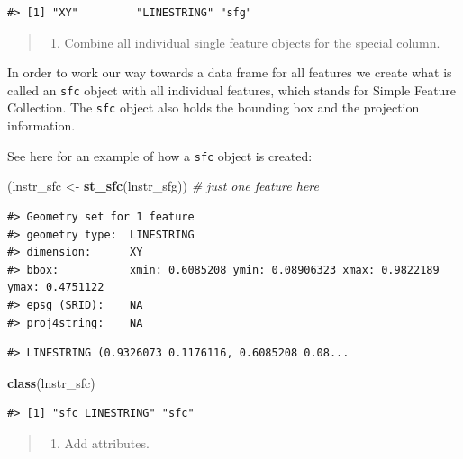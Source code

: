 \documentclass[]{book}
\newenvironment{Shaded}{\begin{snugshade}}{\end{snugshade}}
\newcommand{\KeywordTok}[1]{\textcolor[rgb]{0.13,0.29,0.53}{\textbf{#1}}}
\newcommand{\StringTok}[1]{\textcolor[rgb]{0.31,0.60,0.02}{#1}}
\newcommand{\CommentTok}[1]{\textcolor[rgb]{0.56,0.35,0.01}{\textit{#1}}}
\newcommand{\NormalTok}[1]{#1}
\providecommand{\tightlist}{%
  \setlength{\itemsep}{0pt}\setlength{\parskip}{0pt}}
\theoremstyle{definition}
\theoremstyle{definition}
\theoremstyle{definition}
\theoremstyle{remark}
\begin{document}
\begin{verbatim}
#> [1] "XY"         "LINESTRING" "sfg"
\end{verbatim}

\begin{quote}
\begin{enumerate}
\def\labelenumi{\Roman{enumi}.}
\setcounter{enumi}{1}
\tightlist
\item
  Combine all individual single feature objects for the special column.
\end{enumerate}
\end{quote}

In order to work our way towards a data frame for all features we create
what is called an \texttt{sfc} object with all individual features,
which stands for Simple Feature Collection. The \texttt{sfc} object also
holds the bounding box and the projection information.

See here for an example of how a \texttt{sfc} object is created:

\begin{Shaded}
\begin{Highlighting}[]
\NormalTok{(lnstr_sfc <-}\StringTok{ }\KeywordTok{st_sfc}\NormalTok{(lnstr_sfg)) }\CommentTok{# just one feature here}
\end{Highlighting}
\end{Shaded}

\begin{verbatim}
#> Geometry set for 1 feature 
#> geometry type:  LINESTRING
#> dimension:      XY
#> bbox:           xmin: 0.6085208 ymin: 0.08906323 xmax: 0.9822189 ymax: 0.4751122
#> epsg (SRID):    NA
#> proj4string:    NA
\end{verbatim}

\begin{verbatim}
#> LINESTRING (0.9326073 0.1176116, 0.6085208 0.08...
\end{verbatim}

\begin{Shaded}
\begin{Highlighting}[]
\KeywordTok{class}\NormalTok{(lnstr_sfc) }
\end{Highlighting}
\end{Shaded}

\begin{verbatim}
#> [1] "sfc_LINESTRING" "sfc"
\end{verbatim}

\begin{quote}
\begin{enumerate}
\def\labelenumi{\Roman{enumi}.}
\setcounter{enumi}{2}
\tightlist
\item
  Add attributes.
\end{enumerate}
\end{quote}
\end{document}
